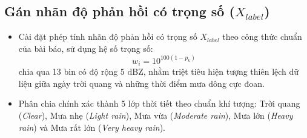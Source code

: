 \documentclass[12pt,a4paper]{article}
\begin{document}
\subsection{Gán nhãn độ phản hồi có trọng số ($X_{label}$)}
\begin{itemize}
    \item Cài đặt phép tính nhãn độ phản hồi có trọng số $X_{label}$ theo công thức chuẩn của bài báo, sử dụng hệ số trọng số:
    \[
        w_i = 10^{100(1 - p_k)}
    \]
    chia qua 13 bin có độ rộng $5\text{ dBZ}$, nhằm triệt tiêu hiện tượng thiên lệch dữ liệu giữa ngày trời quang và những thời điểm mưa dông cực đoan.
    \item Phân chia chính xác thành 5 lớp thời tiết theo chuẩn khí tượng: Trời quang (\textit{Clear}), Mưa nhẹ (\textit{Light rain}), Mưa vừa (\textit{Moderate rain}), Mưa lớn (\textit{Heavy rain}) và Mưa rất lớn (\textit{Very heavy rain}).
\end{itemize}
\end{document}
